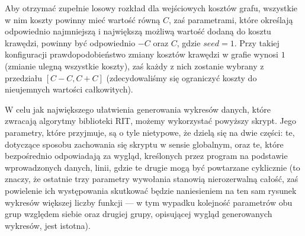 Aby otrzymać zupełnie losowy rozkład dla wejściowych kosztów grafu, wszystkie w nim koszty powinny mieć wartość równą $C$, zaś parametrami, które określają odpowiednio najmniejszą i największą możliwą wartość dodaną do kosztu krawędzi, powinny być odpowiednio $-C$ oraz $C$, gdzie $seed = 1$. Przy takiej konfiguracji prawdopodobieństwo zmiany kosztów krawędzi w grafie wynosi $1$ (zmianie ulegną wszystkie koszty), zaś każdy z nich zostanie wybrany z przedziału $\left[ C - C, C + C \right]$ (zdecydowaliśmy się ograniczyć koszty do nieujemnych wartości całkowitych).


W celu jak największego ułatwienia generowania wykresów danych, które zwracają algorytmy biblioteki \textsc{RIT}, możemy wykorzystać powyższy skrypt. Jego parametry, które przyjmuje, są o tyle nietypowe, że dzielą się na dwie części: te, dotyczące sposobu zachowania się skryptu w sensie globalnym, oraz te, które bezpośrednio odpowiadają za wygląd, kreślonych przez program na podstawie wprowadzonych danych, linii, gdzie te drugie mogą być powtarzane cyklicznie (to znaczy, że ostatnie trzy parametry wywołania stanowią nierozerwalną całość, zaś powielenie ich występowania skutkować będzie naniesieniem na ten sam rysunek wykresów większej liczby funkcji --- w tym wypadku kolejność parametrów obu grup względem siebie oraz drugiej grupy, opisującej wygląd generowanych wykresów, jest istotna).

